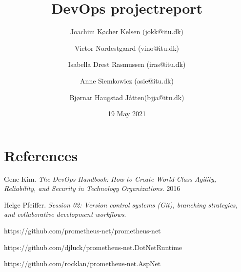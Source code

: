 \documentclass{article}
\title{DevOps projectreport}
\author{Joachim Køcher Kelsen (jokk@itu.dk) \and Victor Nordestgaard (vino@itu.dk) \and Isabella Drest Rasmussen (iras@itu.dk) \and Anne Siemkowicz (asie@itu.dk) \and Bjørnar Haugstad Jåtten(bjja@itu.dk)}
\date{19 May 2021}
\begin{document}
{}

\maketitle

\newpage

\tableofcontents

\newpage



\newpage



\newpage



\newpage



\newpage

\section{References}

\begin{thebibliography}{9}
Gene Kim.
\textit{The DevOps Handbook: How to Create World-Class Agility, Reliability, and Security in Technology Organizations}. 
2016

Helge Pfeiffer. 
\textit{Session 02: Version control systems (Git), branching strategies, and collaborative development workflows}. 

https://github.com/prometheus-net/prometheus-net

https://github.com/djluck/prometheus-net.DotNetRuntime

https://github.com/rocklan/prometheus-net.AspNet

\end{thebibliography}

\newpage
\end{document}

